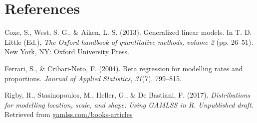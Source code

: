 \documentclass[english,man]{apa6}
\theoremstyle{definition}
\theoremstyle{definition}
\theoremstyle{remark}
\begin{document}
\newpage

\section{References}\label{references}

\setlength{\parindent}{-0.5in} \setlength{\leftskip}{0.5in}

\hypertarget{refs}{}
\hypertarget{ref-coxe2013generalized}{}
Coxe, S., West, S. G., \& Aiken, L. S. (2013). Generalized linear
models. In T. D. Little (Ed.), \emph{The Oxford handbook of quantitative
methods, volume 2} (pp. 26--51). New York, NY: Oxford University Press.

\hypertarget{ref-ferrari2004beta}{}
Ferrari, S., \& Cribari-Neto, F. (2004). Beta regression for modelling
rates and proportions. \emph{Journal of Applied Statistics},
\emph{31}(7), 799--815.

\hypertarget{ref-rigby2017distributions}{}
Rigby, R., Stasinopoulos, M., Heller, G., \& De Bastiani, F. (2017).
\emph{Distributions for modelling location, scale, and shape: Using
GAMLSS in R. Unpublished draft}. Retrieved from
\url{gamlss.com/books-articles}
\end{document}
